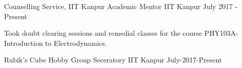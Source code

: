 \vspace{-0.3cm}


\begin{cventries}

  \extraentry
  {Counselling Service, IIT Kanpur}
  {Academic Mentor}
  {IIT Kanpur}
  {July 2017 - Present}
  {
    \begin{cvitems}
    \item Took doubt clearing sessions and remedial classes for the course PHY103A-Introduction to Electrodynamics.
    \end{cvitems}
  }


  \extraentry
  {Rubik's Cube Hobby Group}
  {Seceratory}
  {IIT Kanpur}
  {July-2017-Present}
    \begin{cvitems}
    \end{cvitems}
    
\end{cventries}

